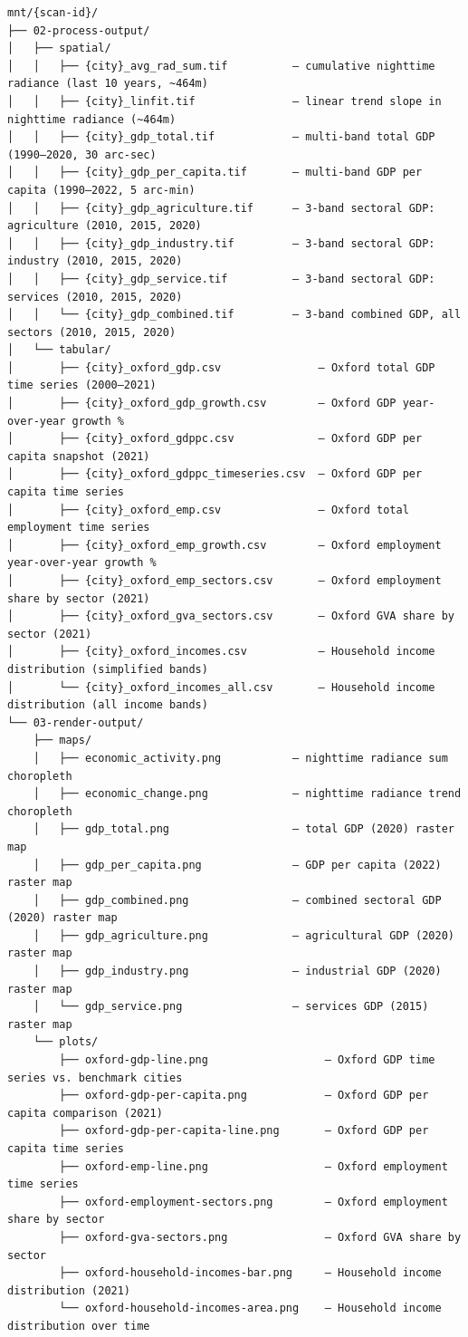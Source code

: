 \documentclass[
  letterpaper,
  DIV=11,
  numbers=noendperiod]{scrreprt}
\begin{document}
\begin{verbatim}
mnt/{scan-id}/
├── 02-process-output/
│   ├── spatial/
│   │   ├── {city}_avg_rad_sum.tif          — cumulative nighttime radiance (last 10 years, ~464m)
│   │   ├── {city}_linfit.tif               — linear trend slope in nighttime radiance (~464m)
│   │   ├── {city}_gdp_total.tif            — multi-band total GDP (1990–2020, 30 arc-sec)
│   │   ├── {city}_gdp_per_capita.tif       — multi-band GDP per capita (1990–2022, 5 arc-min)
│   │   ├── {city}_gdp_agriculture.tif      — 3-band sectoral GDP: agriculture (2010, 2015, 2020)
│   │   ├── {city}_gdp_industry.tif         — 3-band sectoral GDP: industry (2010, 2015, 2020)
│   │   ├── {city}_gdp_service.tif          — 3-band sectoral GDP: services (2010, 2015, 2020)
│   │   └── {city}_gdp_combined.tif         — 3-band combined GDP, all sectors (2010, 2015, 2020)
│   └── tabular/
│       ├── {city}_oxford_gdp.csv               — Oxford total GDP time series (2000–2021)
│       ├── {city}_oxford_gdp_growth.csv        — Oxford GDP year-over-year growth %
│       ├── {city}_oxford_gdppc.csv             — Oxford GDP per capita snapshot (2021)
│       ├── {city}_oxford_gdppc_timeseries.csv  — Oxford GDP per capita time series
│       ├── {city}_oxford_emp.csv               — Oxford total employment time series
│       ├── {city}_oxford_emp_growth.csv        — Oxford employment year-over-year growth %
│       ├── {city}_oxford_emp_sectors.csv       — Oxford employment share by sector (2021)
│       ├── {city}_oxford_gva_sectors.csv       — Oxford GVA share by sector (2021)
│       ├── {city}_oxford_incomes.csv           — Household income distribution (simplified bands)
│       └── {city}_oxford_incomes_all.csv       — Household income distribution (all income bands)
└── 03-render-output/
    ├── maps/
    │   ├── economic_activity.png           — nighttime radiance sum choropleth
    │   ├── economic_change.png             — nighttime radiance trend choropleth
    │   ├── gdp_total.png                   — total GDP (2020) raster map
    │   ├── gdp_per_capita.png              — GDP per capita (2022) raster map
    │   ├── gdp_combined.png                — combined sectoral GDP (2020) raster map
    │   ├── gdp_agriculture.png             — agricultural GDP (2020) raster map
    │   ├── gdp_industry.png                — industrial GDP (2020) raster map
    │   └── gdp_service.png                 — services GDP (2015) raster map
    └── plots/
        ├── oxford-gdp-line.png                  — Oxford GDP time series vs. benchmark cities
        ├── oxford-gdp-per-capita.png            — Oxford GDP per capita comparison (2021)
        ├── oxford-gdp-per-capita-line.png       — Oxford GDP per capita time series
        ├── oxford-emp-line.png                  — Oxford employment time series
        ├── oxford-employment-sectors.png        — Oxford employment share by sector
        ├── oxford-gva-sectors.png               — Oxford GVA share by sector
        ├── oxford-household-incomes-bar.png     — Household income distribution (2021)
        └── oxford-household-incomes-area.png    — Household income distribution over time
\end{verbatim}
\end{document}
